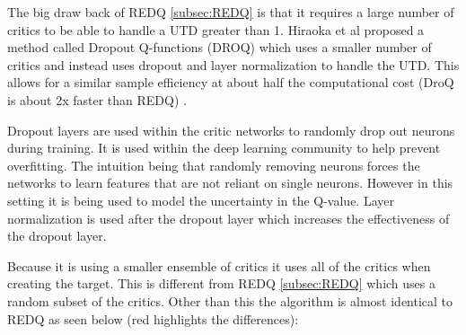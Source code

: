 The big draw back of REDQ \ref{subsec:REDQ} is that it requires a large number of critics to be able to handle a UTD greater than 1. Hiraoka et al \cite{hiraokaDropoutQFunctionsDoubly2022} proposed a method called Dropout Q-functions (DROQ) which uses a smaller number of critics and instead uses dropout and layer normalization to handle the UTD. This allows for a similar sample efficiency at about half the computational cost (DroQ is about 2x faster than REDQ) \cite{hiraokaDropoutQFunctionsDoubly2022}.

Dropout layers \cite{srivastavaDropoutSimpleWay2014} are used within the critic networks to randomly drop out neurons during training. It is used within the deep learning community to help prevent overfitting. The intuition being that randomly removing neurons forces the networks to learn features that are not reliant on single neurons. However in this setting it is being used to model the uncertainty in the Q-value. Layer normalization \cite{baLayerNormalization2016} is used after the dropout layer which increases the effectiveness of the dropout layer.

Because it is using a smaller ensemble of critics it uses all of the critics when creating the target. This is different from REDQ \ref{subsec:REDQ} which uses a random subset of the critics. Other than this the algorithm is almost identical to REDQ as seen below (red highlights the differences):


